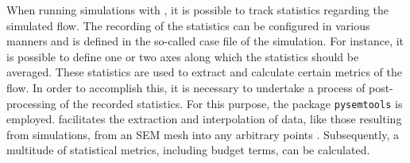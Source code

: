 When running simulations with , it is possible to track statistics regarding the  simulated flow.  The recording of the statistics can be configured in various manners and is defined in the so-called case file of the simulation.
For instance, it is possible to define one or two axes along which the statistics should be averaged. 
These statistics are used to extract and calculate certain metrics of the flow. In order to accomplish this, it is necessary to undertake a process of post-processing of the recorded statistics. 
For this purpose,  the  package \texttt{pysemtools} is employed. 
 facilitates the extraction and interpolation of data, like those resulting from   simulations, from an SEM mesh into any arbitrary points . 
Subsequently, a multitude of statistical metrics, including budget terms, can be calculated. 

